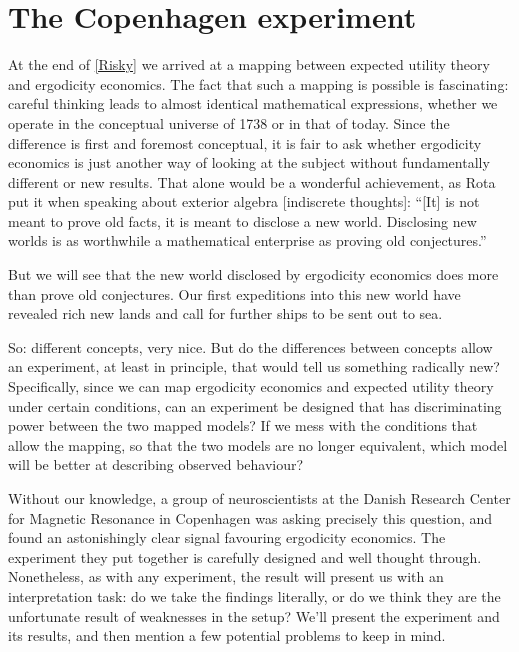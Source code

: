 \section{The Copenhagen experiment}
At the end of \cref{Risky} we arrived at a mapping between expected utility 
theory and ergodicity economics. The fact that such a mapping is possible is fascinating: careful 
thinking leads to almost identical mathematical expressions, whether we operate in the conceptual
universe of 1738 or in that of today. Since the difference is first and foremost conceptual, 
it is fair to ask whether ergodicity economics is just another way of looking at the subject
without fundamentally different or new results. That alone would be a wonderful achievement,
as Rota put it when speaking about exterior algebra \cite[p.48]{Rota} [indiscrete thoughts]: 
``[It] is not meant to prove old facts, it is meant to disclose a new world. Disclosing new 
worlds is as worthwhile a mathematical enterprise as proving old conjectures.''

But we will see that the new world disclosed by ergodicity economics does more than 
prove old conjectures. Our first expeditions into this new world have revealed rich 
new lands and call for further ships to be sent out to sea.

So: different concepts, very nice. But do the differences between concepts allow an experiment, 
at least in principle, that would tell us something radically new? Specifically, since we can 
map ergodicity economics and expected utility theory under certain conditions, can an experiment
be designed that has discriminating power between the two mapped models? If we mess with the
conditions that allow the mapping, so that the two models are no longer equivalent, which model
will be better at describing observed behaviour?

Without our knowledge, a group of neuroscientists at the Danish Research Center for Magnetic 
Resonance in Copenhagen was asking precisely this question, and found an astonishingly clear
signal favouring ergodicity economics. The experiment they put together is
carefully designed and well thought through. Nonetheless, as with any experiment, the result will 
present us with an interpretation task: do we take the findings literally, or do we think they are 
the unfortunate result of weaknesses in the setup? We'll present the experiment and its results, 
and then mention a few potential problems to keep in mind.

